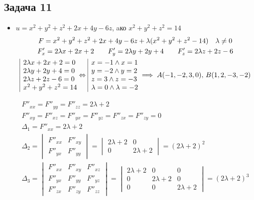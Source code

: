 \documentclass[a4paper,fleqn,12pt]{article}
\theoremstyle{definition}
\begin{document}
\subsection*{Задача 11}

\begin{itemize}
\item $u = x^2 + y^2+ z^2 +2x + 4y -6z $, aко $ x^2 + y^2+ z^2 = 14$
\begin{gather*}
F = x^2 + y^2+ z^2 +2x + 4y -6z + \lambda( x^2 + y^2+ z^2 - 14) \quad \lambda \neq 0\\
F'_x = 2\lambda x + 2x + 2 \qquad F'_y = 2\lambda y + 2y + 4 \qquad F'_z = 2\lambda z + 2z -6 \\
\begin{array}{|l@{}}
2\lambda x + 2x + 2 = 0 \\
2\lambda y + 2y + 4  = 0 \\
2\lambda z + 2z -6 = 0 \\
x^2 + y^2+ z^2 = 14
\end{array}\Leftrightarrow 
\begin{array}{|l@{}}
x = -1 \land x = 1 \\
y = -2 \land y = 2 \\
z = 3 \land z = -3 \\
\lambda = 0 \land \lambda = -2 
\end{array} \implies A(-1,-2,3,0), \, B(1,2,-3,-2) 
\end{gather*}

\begin{gather*}
F''_{xx} = F''_{yy} = F''_{zz} = 2\lambda + 2 \\
F''_{xy} = F''_{xz} = F''_{yx} = F''_{yz} = F''_{zx} = F''_{zy} = 0 \\
\Delta_1 = F''_{xx} = 2\lambda + 2 \\
 \Delta_2 = \begin{vmatrix} F''_{xx} & F''_{xy} \\ F''_{yx} & F''_{yy} \end{vmatrix} = \begin{vmatrix} 2\lambda + 2 & 0 \\0 & 2\lambda + 2  \end{vmatrix} = (2\lambda + 2)^2\\
\Delta_3 = \begin{vmatrix} F''_{xx} & F''_{xy} & F''_{xz}\\ F''_{yx} & F''_{yy} & F''_{yz} \\ F''_{zx} & F''_{zy} & F''_{zz}\end{vmatrix} = \begin{vmatrix} 2\lambda + 2 & 0 & 0 \\ 0 & 2\lambda + 2 & 0 \\ 0 & 0 & 2\lambda + 2 \end{vmatrix} = (2\lambda + 2)^3 
\end{gather*}


\end{itemize}
\end{document}
